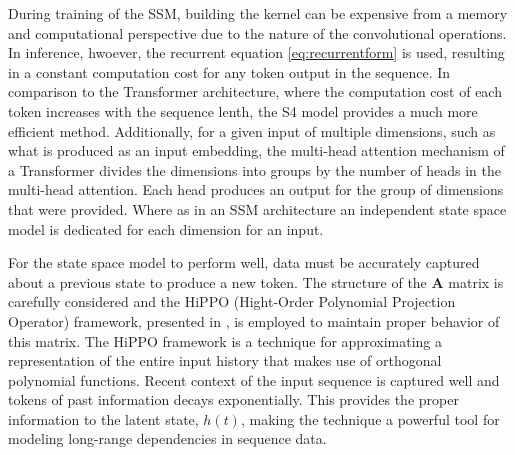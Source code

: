 \documentclass[conference]{IEEEtran}
\newcommand{\gr}[1]{\textcolor{green}{#1}}
\begin{document}
During training of the SSM, building the kernel can be expensive from a memory and computational perspective due to the nature of the convolutional operations. In inference, hwoever, the recurrent equation \eqref{eq:recurrentform} is used, resulting in a constant computation cost for any token output in the sequence. In comparison to the Transformer architecture, where the computation cost of each token increases with the sequence lenth, the S4 model provides a much more efficient method.
Additionally, for a given input of multiple dimensions, such as what is produced as an input embedding, the multi-head attention mechanism of a Transformer divides the dimensions into groups by the number of heads in the multi-head attention. Each head produces an output for the group of dimensions that were provided. Where as in an SSM architecture an independent state space model is dedicated for each dimension for an input.

For the state space model to perform well, data must be accurately captured about a previous state to produce a new token. The structure of the $\mathbf{A}$ matrix is carefully considered and the HiPPO (Hight-Order Polynomial Projection Operator) framework, presented in \cite{gu2020hippo}, is employed to maintain proper behavior of this matrix. The HiPPO framework is a technique for approximating a representation of the entire input history that makes use of orthogonal polynomial functions. Recent context of the input sequence is captured well and tokens of past information decays exponentially. This provides the proper information to the latent state, $h(t)$, making the technique a powerful tool for modeling long-range dependencies in sequence data.



\end{document}
